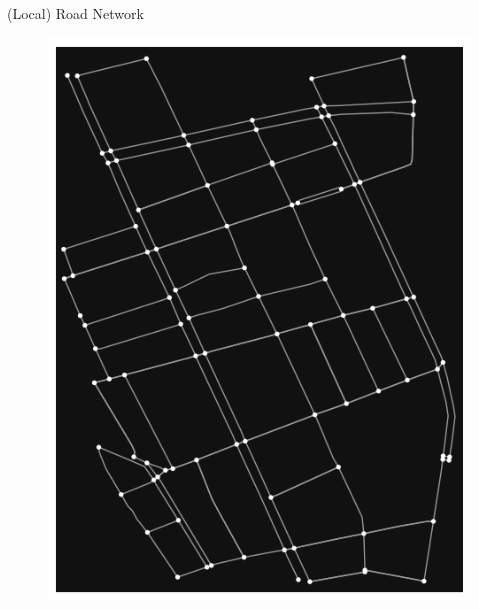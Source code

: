 \documentclass[aspectratio=169, bigfiles, professionalfonts, hyperref={colorlinks=true, allcolors=., urlcolor=blue}]{beamer}
\begin{document}
\begin{frame}{(Local) Road Network}
\begin{figure}
\centering
\begin{minipage}{.5\textwidth}
\centering
  \includegraphics[scale=.4]{roadnetwork.png}
  \label{fig:roadnetwork}
\end{minipage}%
\begin{minipage}{.5\textwidth}
\centering

\end{minipage}
\end{figure}
\end{frame}
\end{document}
